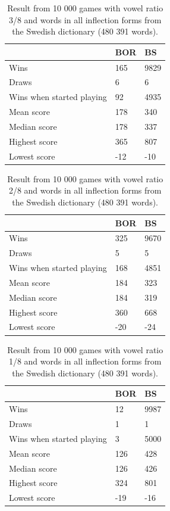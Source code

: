 \documentclass[a4paper, 12pt]{report}
\begin{document}
\begin{table}[h]
\centering
    \begin{tabular}{ l | l | l }
   	& BOR & BS \\
   	\hline
   	Wins & 165 & 9829 \\
	Draws & 6 & 6 \\
	Wins when started playing & 92 & 4935 \\   	
	Mean score & 178 & 340 \\
	Median score & 178 & 337 \\	 	 
	Highest score & 365 & 807 \\
	Lowest score & -12 & -10 \\		
    \end{tabular}
\caption{Result from 10 000 games with vowel ratio 3/8 and words in all inflection forms from the Swedish dictionary (480 391 words).}
\label{tab:borbsstats3}
\end{table}

\begin{table}[h]
\centering
    \begin{tabular}{ l | l | l }
   	& BOR & BS \\
   	\hline
   	Wins & 325 & 9670 \\
	Draws & 5 & 5 \\
	Wins when started playing & 168 & 4851 \\   	
	Mean score & 184 & 323 \\
	Median score & 184 & 319 \\	 	 
	Highest score & 360 & 668 \\
	Lowest score & -20 & -24 \\		
    \end{tabular}
\caption{Result from 10 000 games with vowel ratio 2/8 and words in all inflection forms from the Swedish dictionary (480 391 words).}
\label{tab:borbsstats2}
\end{table}

\begin{table}[h]
\centering
    \begin{tabular}{ l | l | l }
   	& BOR & BS \\
   	\hline
   	Wins & 12 & 9987 \\
	Draws & 1 & 1 \\
	Wins when started playing & 3 & 5000 \\   	
	Mean score & 126 & 428 \\
	Median score & 126 & 426 \\	 	 
	Highest score & 324 & 801 \\
	Lowest score & -19 & -16 \\		
    \end{tabular}
\caption{Result from 10 000 games with vowel ratio 1/8 and words in all inflection forms from the Swedish dictionary (480 391 words).}
\label{tab:borbsstats1}
\end{table}
\end{document}
